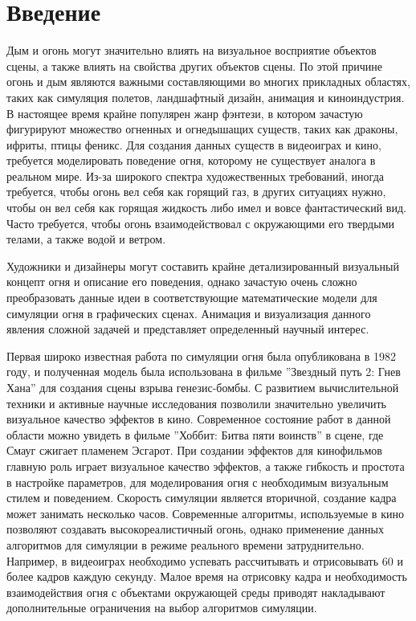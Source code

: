 \part*{Введение}

Дым и огонь могут значительно влиять на визуальное восприятие объектов сцены, а
также влиять на свойства других объектов сцены. По этой причине огонь и дым
являются важными составляющими во многих прикладных областях, таких как
симуляция полетов, ландшафтный дизайн, анимация и киноиндустрия. В настоящее
время крайне популярен жанр фэнтези, в котором зачастую фигурируют множество
огненных и огнедышащих существ, таких как драконы, ифриты, птицы феникс. Для
создания данных существ в видеоиграх и кино, требуется моделировать поведение
огня, которому не существует аналога в реальном мире.  Из-за широкого спектра
художественных требований, иногда требуется, чтобы огонь вел себя как горящий
газ, в других ситуациях нужно, чтобы он вел себя как горящая жидкость либо имел
и вовсе фантастический вид. Часто требуется, чтобы огонь взаимодействовал с
окружающими его твердыми телами, а также водой и ветром.

Художники и дизайнеры могут составить крайне детализированный визуальный концепт
огня и описание его поведения, однако зачастую очень сложно преобразовать
данные идеи в соответствующие математические модели для симуляции огня в
графических сценах. Анимация и визуализация данного явления сложной задачей и
представляет определенный научный интерес.

Первая широко известная работа по симуляции огня была опубликована в 1982 году,
и полученная модель была использована в фильме ''Звездный путь 2: Гнев Хана''
для создания сцены взрыва генезис-бомбы. С развитием вычислительной техники и
активные научные исследования позволили значительно увеличить визуальное
качество эффектов в кино. Современное состояние работ в данной области можно
увидеть в фильме ''Хоббит: Битва пяти воинств'' в сцене, где Смауг сжигает
пламенем Эсгарот. При создании эффектов для кинофильмов главную роль играет
визуальное качество эффектов, а также гибкость и простота в настройке
параметров, для моделирования огня с необходимым визуальным стилем и поведением.
Скорость симуляции является вторичной, создание кадра может занимать несколько
часов. Современные алгоритмы, используемые в кино позволяют создавать
высокореалистичный огонь, однако применение данных алгоритмов для симуляции в
режиме реального времени затруднительно. Например, в видеоиграх необходимо
успевать рассчитывать и отрисовывать 60 и более кадров каждую секунду. Малое
время на отрисовку кадра и необходимость взаимодействия огня с объектами
окружающей среды приводят накладывают дополнительные ограничения на выбор
алгоритмов симуляции.

